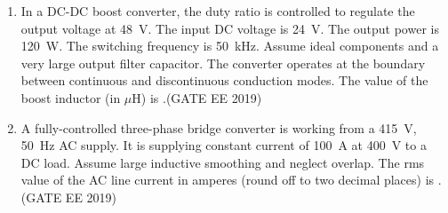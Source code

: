 \documentclass[a4paper,10pt]{exam}
\theoremstyle{remark}
\begin{document}
\begin{enumerate}
\begin{enumerate}[label=\arabic*.]
\item In a DC-DC boost converter, the duty ratio is controlled to regulate the output voltage at 48~V. The input DC voltage is 24~V. The output power is 120~W. The switching frequency is 50~kHz. Assume ideal components and a very large output filter capacitor. The converter operates at the boundary between continuous and discontinuous conduction modes. The value of the boost inductor (in $\mu$H) is \underline{\hspace{2cm}}.\hfill{(GATE EE 2019)}

    \item A fully-controlled three-phase bridge converter is working from a 415~V, 50~Hz AC supply. It is supplying constant current of 100~A at 400~V to a DC load. Assume large inductive smoothing and neglect overlap. The rms value of the AC line current in amperes (round off to two decimal places) is \underline{\hspace{2cm}}.\hfill{(GATE EE 2019)}


\end{enumerate}
\end{enumerate}
\end{document}
